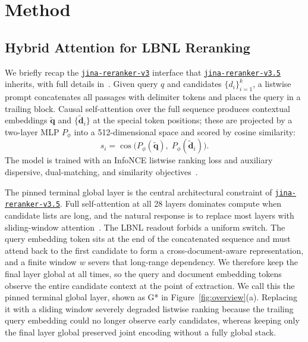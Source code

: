\documentclass{article}
\newcommand{\jrrvthree}{\href{https://huggingface.co/jinaai/jina-reranker-v3}{\texttt{jina-reranker-v3}}}
\newcommand{\jrrvthreefive}{\href{https://huggingface.co/jinaai/jina-reranker-v3.5}{\texttt{jina-reranker-v3.5}}}
\begin{document}
\section{Method}
\label{sec:method}

\subsection{Hybrid Attention for LBNL Reranking}
\label{sec:hybrid-attention}

We briefly recap the \jrrvthree{} interface that \jrrvthreefive{} inherits, with full details in~\cite{wang2025jinarerankerv3}.
Given query $q$ and candidates $\{d_i\}_{i=1}^{k}$, a listwise prompt concatenates all passages with delimiter tokens and places the query in a trailing block.
Causal self-attention over the full sequence produces contextual embeddings $\tilde{\mathbf{q}}$ and $\{\tilde{\mathbf{d}}_i\}$ at the special token positions; these are projected by a two-layer MLP $P_\phi$ into a 512-dimensional space and scored by cosine similarity:
\begin{equation}
  s_i = \cos\bigl(P_\phi(\tilde{\mathbf{q}}),\; P_\phi(\tilde{\mathbf{d}}_i)\bigr).
\end{equation}
The model is trained with an InfoNCE listwise ranking loss and auxiliary dispersive, dual-matching, and similarity objectives~\cite{wang2025jinarerankerv3,oord2019representation,huang2024cosent,wang2024contrastive}.



The pinned terminal global layer is the central architectural constraint of \jrrvthreefive{}. Full self-attention at all 28 layers dominates compute when candidate lists are long, and the natural response is to replace most layers with sliding-window attention~\cite{beltagy2020longformer,jiang2023mistral}. The LBNL readout forbids a uniform switch. The query embedding token sits at the end of the concatenated sequence and must attend back to the first candidate to form a cross-document-aware representation, and a finite window $w$ severs that long-range dependency. We therefore keep the final layer global at all times, so the query and document embedding tokens observe the entire candidate context at the point of extraction. We call this the pinned terminal global layer, shown as G* in Figure~\ref{fig:overview}(a). Replacing it with a sliding window severely degraded listwise ranking because the trailing query embedding could no longer observe early candidates, whereas keeping only the final layer global preserved joint encoding without a fully global stack.
\end{document}
